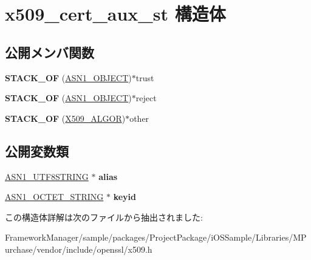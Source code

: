 \hypertarget{structx509__cert__aux__st}{}\section{x509\+\_\+cert\+\_\+aux\+\_\+st 構造体}
\label{structx509__cert__aux__st}
\subsection*{公開メンバ関数}
\begin{DoxyCompactItemize}
\item 
\hypertarget{structx509__cert__aux__st_ad4b8077f431c0da89bdbd1978f789ddd}{}{\bfseries S\+T\+A\+C\+K\+\_\+\+O\+F} (\hyperlink{structasn1__object__st}{A\+S\+N1\+\_\+\+O\+B\+J\+E\+C\+T})$\ast$trust\label{structx509__cert__aux__st_ad4b8077f431c0da89bdbd1978f789ddd}

\item 
\hypertarget{structx509__cert__aux__st_a0ee0ce86f6686d7c209016b00dec98cb}{}{\bfseries S\+T\+A\+C\+K\+\_\+\+O\+F} (\hyperlink{structasn1__object__st}{A\+S\+N1\+\_\+\+O\+B\+J\+E\+C\+T})$\ast$reject\label{structx509__cert__aux__st_a0ee0ce86f6686d7c209016b00dec98cb}

\item 
\hypertarget{structx509__cert__aux__st_a5bb857958015dab429b264c21db5b980}{}{\bfseries S\+T\+A\+C\+K\+\_\+\+O\+F} (\hyperlink{struct_x509__algor__st}{X509\+\_\+\+A\+L\+G\+O\+R})$\ast$other\label{structx509__cert__aux__st_a5bb857958015dab429b264c21db5b980}

\end{DoxyCompactItemize}
\subsection*{公開変数類}
\begin{DoxyCompactItemize}
\item 
\hypertarget{structx509__cert__aux__st_a1a7eaa5e4a497f4b697d4709e5117d5b}{}\hyperlink{structasn1__string__st}{A\+S\+N1\+\_\+\+U\+T\+F8\+S\+T\+R\+I\+N\+G} $\ast$ {\bfseries alias}\label{structx509__cert__aux__st_a1a7eaa5e4a497f4b697d4709e5117d5b}

\item 
\hypertarget{structx509__cert__aux__st_a6f0743e8b9131e4502d55ca83d278801}{}\hyperlink{structasn1__string__st}{A\+S\+N1\+\_\+\+O\+C\+T\+E\+T\+\_\+\+S\+T\+R\+I\+N\+G} $\ast$ {\bfseries keyid}\label{structx509__cert__aux__st_a6f0743e8b9131e4502d55ca83d278801}

\end{DoxyCompactItemize}


この構造体詳解は次のファイルから抽出されました\+:\begin{DoxyCompactItemize}
\item 
Framework\+Manager/sample/packages/\+Project\+Package/i\+O\+S\+Sample/\+Libraries/\+M\+Purchase/vendor/include/openssl/x509.\+h\end{DoxyCompactItemize}
